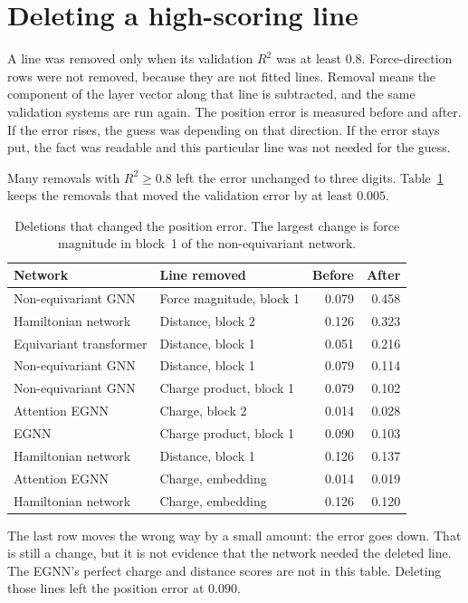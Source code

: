 \documentclass[11pt]{article}
\begin{document}
\section{Deleting a high-scoring line}

A line was removed only when its validation $R^2$ was at least $0.8$.
Force-direction rows were not removed, because they are not fitted lines.
Removal means the component of the layer vector along that line is subtracted, and the same validation systems are run again.
The position error is measured before and after.
If the error rises, the guess was depending on that direction.
If the error stays put, the fact was readable and this particular line was not needed for the guess.

Many removals with $R^2 \ge 0.8$ left the error unchanged to three digits.
Table~\ref{tab:ablate} keeps the removals that moved the validation error by at least $0.005$.

\begin{table}[ht]
\centering
\caption{Deletions that changed the position error.
The largest change is force magnitude in block~1 of the non-equivariant network.}
\label{tab:ablate}
\begin{tabular}{llrr}
\toprule
Network & Line removed & Before & After \\
\midrule
Non-equivariant GNN & Force magnitude, block 1 & 0.079 & 0.458 \\
Hamiltonian network & Distance, block 2 & 0.126 & 0.323 \\
Equivariant transformer & Distance, block 1 & 0.051 & 0.216 \\
Non-equivariant GNN & Distance, block 1 & 0.079 & 0.114 \\
Non-equivariant GNN & Charge product, block 1 & 0.079 & 0.102 \\
Attention EGNN & Charge, block 2 & 0.014 & 0.028 \\
EGNN & Charge product, block 1 & 0.090 & 0.103 \\
Hamiltonian network & Distance, block 1 & 0.126 & 0.137 \\
Attention EGNN & Charge, embedding & 0.014 & 0.019 \\
Hamiltonian network & Charge, embedding & 0.126 & 0.120 \\
\bottomrule
\end{tabular}
\end{table}

The last row moves the wrong way by a small amount: the error goes down.
That is still a change, but it is not evidence that the network needed the deleted line.
The EGNN's perfect charge and distance scores are not in this table.
Deleting those lines left the position error at $0.090$.
\end{document}
